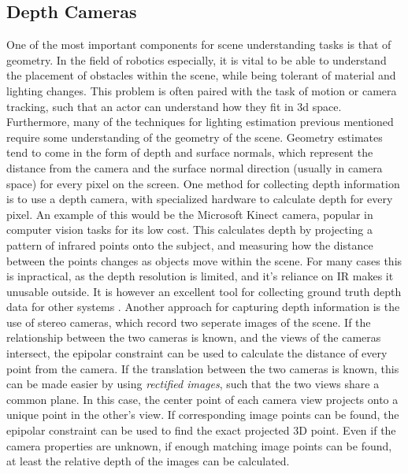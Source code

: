 \documentclass[ %
                    author={Gavin Parker},
                supervisor={Dr. Neill Campbell},
                    degree={MEng},
                     title={Deep Siamese Networks for Illumination Estimation from Stereo Images},
                  subtitle={},
                      type={research},
                      year={2018} ]{dissertation}
\begin{document}
\subsection{Depth Cameras}
One of the most important components for scene understanding tasks is that of geometry. In the field of robotics especially, it is vital to be able to understand the placement of obstacles within the scene, while being tolerant of material and lighting changes. This problem is often paired with the task of motion or camera tracking, such that an actor can understand how they fit in 3d space. Furthermore, many of the techniques for lighting estimation previous mentioned require some understanding of the geometry of the scene. Geometry estimates tend to come in the form of depth and surface normals, which represent the distance from the camera and the surface normal direction (usually in camera space) for every pixel on the screen.
\newline
One method for collecting depth information is to use a depth camera, with specialized hardware to calculate depth for every pixel. An example of this would be the Microsoft Kinect camera, popular in computer vision tasks for its low cost. This calculates depth by projecting a pattern of infrared points onto the subject, and measuring how the distance between the points changes as objects move within the scene. For many cases this is inpractical, as the depth resolution is limited, and it's reliance on IR makes it unusable outside. It is however an excellent tool for collecting ground truth depth data for other systems \cite{Khoshelham_accuracyand}.
\newline
Another approach for capturing depth information is the use of stereo cameras, which record two seperate images of the scene. If the relationship between the two cameras is known, and the views of the cameras intersect, the epipolar constraint can be used to calculate the distance of every point from the camera. If the translation between the two cameras is known, this can be made easier by using \textit{rectified images}, such that the two views share a common plane. In this case, the center point of each camera view projects onto a unique point in the other's view. If corresponding image points can be found, the epipolar constraint can be used to find the exact projected 3D point. Even if the camera properties are unknown, if enough matching image points can be found, at least the relative depth of the images can be calculated.
\end{document}
